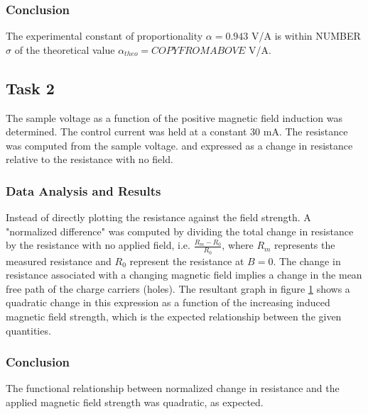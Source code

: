 \documentclass[a4paper]{article}
\begin{document}
\subsubsection{Conclusion}
The experimental constant of proportionality $\alpha = 0.943 $ V/A is
within NUMBER $\sigma$ of the theoretical value $\alpha_{theo} =
COPYFROMABOVE$ V/A.

\subsection{Task 2}

\qq The sample voltage as a function of the positive magnetic field
induction was determined. The control current was held at a constant
30 mA. The resistance was computed from the sample voltage. and
expressed as a change in resistance relative to the resistance with no
field.

\subsubsection{Data Analysis and Results}
\qq Instead of directly plotting the resistance against the field
strength. A "normalized difference" was computed by dividing the total
change in resistance by the resistance with no applied field,
i.e. $\frac{R_m - R_0}{R_0}$, where $R_m$ represents the measured
resistance and $R_0$ represent the resistance at $B=0$. The change in
resistance associated with a changing magnetic field implies a change
in the mean free path of the charge carriers (holes). The resultant
graph in figure \ref{task22plot} shows a quadratic change in this
expression as a function of the increasing induced magnetic field
strength, which is the expected relationship between the given
quantities.

\begin{figure}[H]
\centering
\label{task22plot}
\end{figure}

\subsubsection{Conclusion}
\qq The functional relationship between normalized change in resistance
and the applied magnetic field strength was quadratic, as expected.
\end{document}
